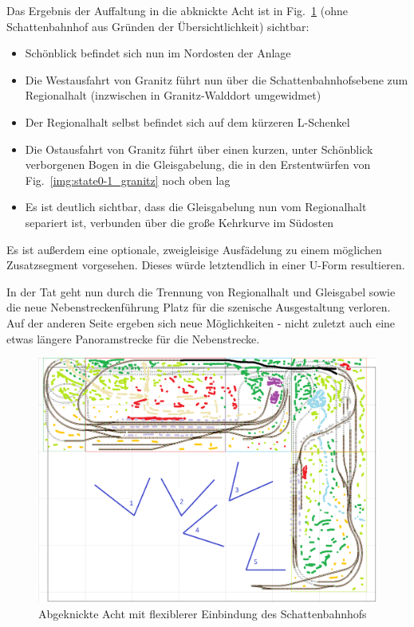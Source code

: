 Das Ergebnis der Auffaltung in die abknickte Acht ist in Fig.~\ref{img:state2_granitz_modules_details} (ohne Schattenbahnhof aus Gr\"unden der \"Ubersichtlichkeit) sichtbar:
\begin{itemize}
	\item Sch\"onblick befindet sich nun im Nordosten der Anlage
	\item Die Westausfahrt von Granitz f\"uhrt nun \"uber die Schattenbahnhofsebene zum Regionalhalt (inzwischen in Granitz-Walddort umgewidmet)
	\item Der Regionalhalt selbst befindet sich auf dem k\"urzeren L-Schenkel
	\item Die Ostausfahrt von Granitz f\"uhrt \"uber einen kurzen, unter Sch\"onblick verborgenen Bogen in die Gleisgabelung, die in den Erstentw\"urfen von Fig.~\ref{img:state0-1_granitz} noch oben lag
	\item Es ist deutlich sichtbar, dass die Gleisgabelung nun vom Regionalhalt separiert ist, verbunden \"uber die gro{\ss}e Kehrkurve im S\"udosten
\end{itemize}

Es ist au{\ss}erdem eine optionale, zweigleisige Ausf\"adelung zu einem m\"oglichen Zusatzsegment vorgesehen.
Dieses w\"urde letztendlich in einer U-Form resultieren.

In der Tat geht nun durch die Trennung von Regionalhalt und Gleisgabel sowie die neue Nebenstreckenf\"uhrung Platz f\"ur die szenische Ausgestaltung verloren.
Auf der anderen Seite ergeben sich neue M\"oglichkeiten - nicht zuletzt auch eine etwas l\"angere Panoramstrecke f\"ur die Nebenstrecke.

\begin{figure}[h]
\centering
  \includegraphics[width=1.0\textwidth]{img/map_evolution/state2_granitz_modules_details.png}
	\caption{Abgeknickte Acht mit flexiblerer Einbindung des Schattenbahnhofs}
	\label{img:state2_granitz_modules_details}
\end{figure}

